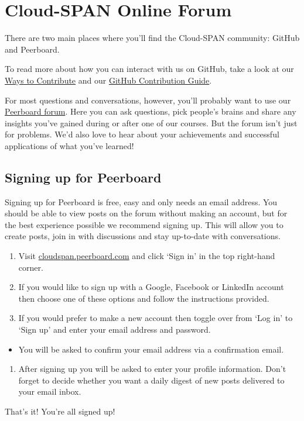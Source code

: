 \documentclass[
]{book}
\providecommand{\tightlist}{%
  \setlength{\itemsep}{0pt}\setlength{\parskip}{0pt}}
\begin{document}
\hypertarget{forum}{%
\chapter{Cloud-SPAN Online Forum}\label{forum}}

There are two main places where you'll find the Cloud-SPAN community: GitHub and Peerboard.

To read more about how you can interact with us on GitHub, take a look at our \protect\hyperlink{ways-to-contribute}{Ways to Contribute} and our \href{https://github.com/Cloud-SPAN/CloudSPAN-handbook/blob/main/CONTRIBUTING.md}{GitHub Contribution Guide}.

For most questions and conversations, however, you'll probably want to use our \href{https://cloudspan.peerboard.com/}{Peerboard forum}. Here you can ask questions, pick people's brains and share any insights you've gained during or after one of our courses.
But the forum isn't just for problems. We'd also love to hear about your achievements and successful applications of what you've learned!

\hypertarget{signing-up-for-peerboard}{%
\section{Signing up for Peerboard}\label{signing-up-for-peerboard}}

Signing up for Peerboard is free, easy and only needs an email address. You should be able to view posts on the forum without making an account, but for the best experience possible we recommend signing up. This will allow you to create posts, join in with discussions and stay up-to-date with conversations.

\begin{enumerate}
\def\labelenumi{\arabic{enumi}.}
\tightlist
\item
  Visit \href{https://cloudspan.peerboard.com/}{cloudspan.peerboard.com} and click `Sign in' in the top right-hand corner.
\item
  If you would like to sign up with a Google, Facebook or LinkedIn account then choose one of these options and follow the instructions provided.
\item
  If you would prefer to make a new account then toggle over from `Log in' to `Sign up' and enter your email address and password.
\end{enumerate}

\begin{itemize}
\tightlist
\item
  You will be asked to confirm your email address via a confirmation email.
\end{itemize}

\begin{enumerate}
\def\labelenumi{\arabic{enumi}.}
\setcounter{enumi}{3}
\tightlist
\item
  After signing up you will be asked to enter your profile information. Don't forget to decide whether you want a daily digest of new posts delivered to your email inbox.
\end{enumerate}

That's it! You're all signed up! 🎉

  
\end{document}
